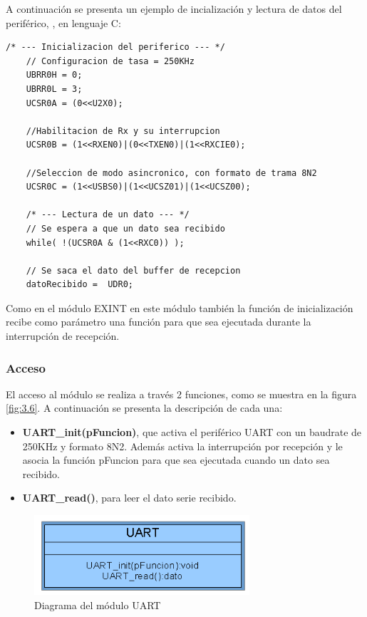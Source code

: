 A continuación se presenta un ejemplo de incialización y lectura de datos del periférico, , en lenguaje C: 

\begin{lstlisting}[style=CStyle]
	/* --- Inicializacion del periferico --- */
	// Configuracion de tasa = 250KHz
	UBRR0H = 0;
	UBRR0L = 3;
	UCSR0A = (0<<U2X0);
	
	//Habilitacion de Rx y su interrupcion
	UCSR0B = (1<<RXEN0)|(0<<TXEN0)|(1<<RXCIE0); 
	
	//Seleccion de modo asincronico, con formato de trama 8N2
	UCSR0C = (1<<USBS0)|(1<<UCSZ01)|(1<<UCSZ00); 

	/* --- Lectura de un dato --- */
	// Se espera a que un dato sea recibido
	while( !(UCSR0A & (1<<RXC0)) ); 
	
	// Se saca el dato del buffer de recepcion
	datoRecibido =  UDR0;
\end{lstlisting}

Como en el módulo EXINT en este módulo también la función de inicialización recibe como parámetro una función para que sea ejecutada durante la interrupción de recepción.


\subsubsection{Acceso}
El acceso al módulo se realiza a través 2 funciones, como se muestra en la figura \ref{fig:3.6}. A continuación se presenta la descripción de cada una:
\begin{itemize}
	\item \textbf{UART\_init(pFuncion)}, que activa el periférico UART con un baudrate de 250KHz y formato 8N2. Además activa la interrupción por recepción y le asocia la función pFuncion para que sea ejecutada cuando un dato sea recibido.
	\item \textbf{UART\_read()}, para leer el dato serie recibido.
\end{itemize}

\begin{figure}[!ht]
	\centering
	\includegraphics[width=8cm,scale=1]{resources/3_6-moduloUART.png}
	\caption{Diagrama del módulo UART}
	\label{fig:\thefigure}
\end{figure}

